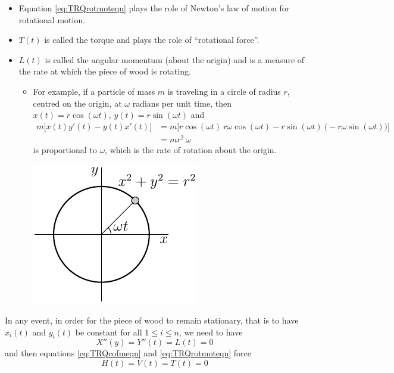 \begin{itemize}
\item Equation \eqref{eq:TRQrotmoteqn} plays the role of Newton's law of
motion for rotational motion.
\item $T(t)$ is called the torque and plays the role of ``rotational force''.
\item
$L(t)$ is called the angular momentum (about the origin) and is a measure
of the rate at which the piece of wood  is rotating.
\begin{itemize}
\item
For example, if a particle of mass $m$ is traveling in a
circle of radius $r$, centred on the origin, at $\omega$ radians per unit time,
then $x(t)=r\cos(\omega t)$,  $y(t)=r\sin(\omega t)$ and
\begin{align*}
m\big[x(t)y'(t)-y(t)x'(t)\big]
&= m \big[r\cos(\omega t)\ r\omega\cos(\omega t)
       -r\sin(\omega t)\ \big(-r\omega\sin(\omega t)\big)\big] \\
&=m r^2\ \omega
\end{align*}
is proportional to $\omega$, which is the rate of rotation about the origin.
\begin{efig}
\begin{center}
    \includegraphics{circularMotion}
\end{center}
\end{efig}
\end{itemize}
\end{itemize}
In any event, in order for the piece of wood to remain stationary,
that is to have $x_i(t)$ and $y_i(t)$ be constant for all
$1\le i\le n$, we need to have
\begin{equation*}
X''(y)=Y''(t)=L(t)=0
\end{equation*}
and then
equations \eqref{eq:TRQcofmeqn} and \eqref{eq:TRQrotmoteqn} force
\begin{equation*}
H(t)=V(t)=T(t)=0
\end{equation*}

